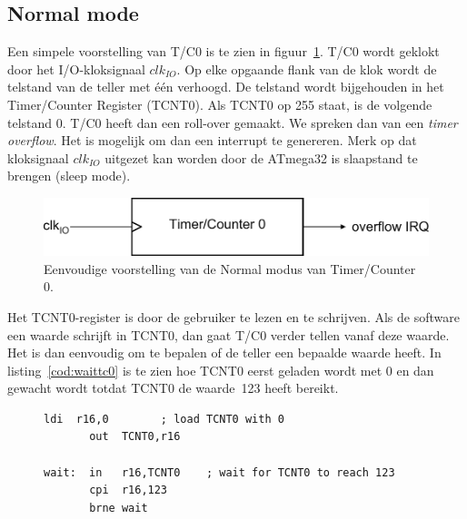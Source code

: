 \subsection{Normal mode}
\label{sec:tc0normalmode}
Een simpele voorstelling van T/C0 is te zien in figuur~\ref{fig:timsimpletc0}.
T/C0 wordt geklokt door het I/O-kloksignaal $clk_{IO}$. Op elke opgaande flank
van de klok wordt de telstand van de teller met \'e\'en verhoogd. De telstand 
wordt bijgehouden in het Timer/Counter Register (TCNT0). Als TCNT0 op 255
staat, is de volgende telstand 0. T/C0 heeft dan een roll-over gemaakt. We
spreken dan van een \textsl{timer overflow}. Het is mogelijk om dan een
interrupt te genereren. Merk op dat kloksignaal $clk_{IO}$ uitgezet kan
worden door de ATmega32 is slaapstand te brengen (sleep mode).

\begin{figure}[!ht]
\centering
\includegraphics[scale=\figscale]{images/timsimpletc0}
\caption{Eenvoudige voorstelling van de Normal modus van Timer/Counter 0.}
\label{fig:timsimpletc0}
\end{figure}


Het TCNT0-register is door de gebruiker te lezen en te schrijven. Als de
software een waarde schrijft in TCNT0, dan gaat T/C0 verder tellen vanaf
deze waarde. Het is dan eenvoudig om te bepalen of de teller een bepaalde
waarde heeft. In listing~\ref{cod:waittc0} is te zien hoe TCNT0 eerst
geladen wordt met 0 en dan gewacht wordt totdat TCNT0 de waarde~123 heeft
bereikt.

\begin{figure}[!ht]
\begin{lstlisting}[language=AVRassembler,caption=Lezen van de tellerwaarde van T/C0.,label=cod:waittc0]
       ldi  r16,0        ; load TCNT0 with 0
       out  TCNT0,r16

wait:  in   r16,TCNT0    ; wait for TCNT0 to reach 123
       cpi  r16,123
       brne wait
\end{lstlisting}
\end{figure}

